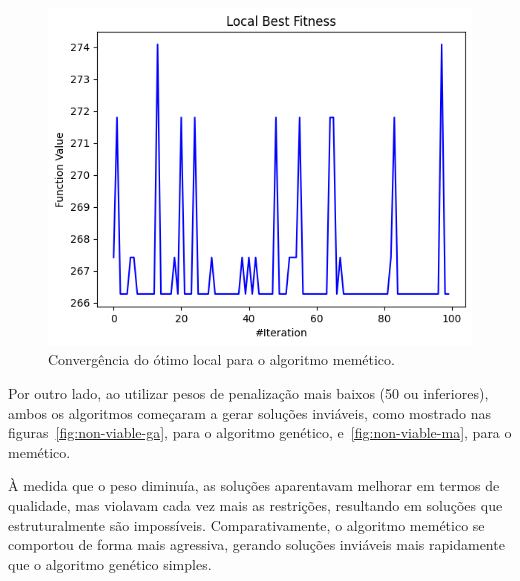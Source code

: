 \begin{figure}
    \centering
    \includegraphics[width=.6\linewidth]{images/convergence/lbfc.png}
    \caption{Convergência do ótimo local para o algoritmo memético.}%
    \label{fig:memetic-local}
\end{figure}

Por outro lado, ao utilizar pesos de penalização mais baixos (50 ou inferiores), ambos os algoritmos começaram a gerar soluções inviáveis, como mostrado nas figuras~\ref{fig:non-viable-ga}, para o algoritmo genético, e~\ref{fig:non-viable-ma}, para o memético.

À medida que o peso diminuía, as soluções aparentavam melhorar em termos de qualidade, mas violavam cada vez mais as restrições, resultando em soluções que estruturalmente são impossíveis.
Comparativamente, o algoritmo memético se comportou de forma mais agressiva, gerando soluções inviáveis mais rapidamente que o algoritmo genético simples.

